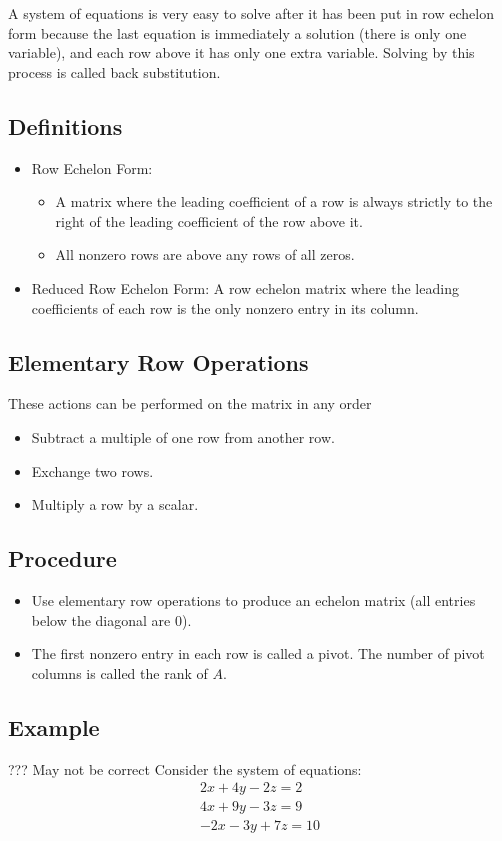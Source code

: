 \documentclass[12pt]{article}
\begin{document}
A system of equations is very easy to solve after it has been put in row echelon form because the last equation is immediately a solution (there is only one variable), and each row above it has only one extra variable.  Solving by this process is called back substitution.

\subsection{Definitions}
\begin{itemize}
\item Row Echelon Form:
	\begin{itemize}
	\item A matrix where the leading coefficient of a row is always strictly to the right of the leading coefficient of the row above it.
	\item All nonzero rows are above any rows of all zeros.
	\end{itemize}
\item Reduced Row Echelon Form: A row echelon matrix where the leading coefficients of each row is the only nonzero entry in its column.
\end{itemize}


\subsection{Elementary Row Operations}
These actions can be performed on the matrix in any order
\begin{itemize}
\item Subtract a multiple of one row from another row.
\item Exchange two rows.
\item Multiply a row by a scalar.
\end{itemize}


\subsection{Procedure}
\begin{itemize}
\item Use elementary row operations to produce an echelon matrix (all entries below the diagonal are 0).
\item The first nonzero entry in each row is called a pivot. The number of pivot columns is called the rank of $A$.
\end{itemize}

\subsection{Example}
??? May not be correct
Consider the system of equations:
\begin{align*}
2x + 4y - 2z = 2\\
4x + 9y - 3z = 9\\
-2x - 3y + 7z = 10
\end{align*}
\end{document}
